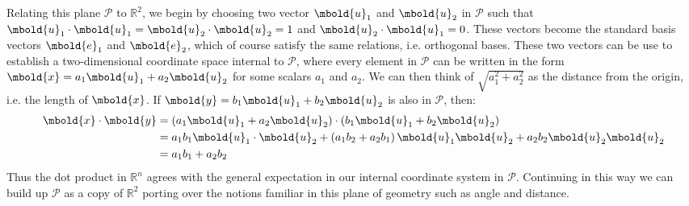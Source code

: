\documentclass[12pt letter]{report}
\begin{document}
Relating this plane $ \mathcal{P}$ to $\mathbb{R}^2$, we begin by choosing two vector $\mbold{u}_1$ and $\mbold{u}_2$ in $ \mathcal{P}$ such that $\mbold{u}_1 \cdot \mbold{u}_1 = \mbold{u}_2 \cdot \mbold{u}_2 = 1$ and $\mbold{u}_2 \cdot \mbold{u}_1 = 0$. These vectors become the standard basis vectors $\mbold{e}_1$ and $\mbold{e}_2$, which of course satisfy the same relations, i.e. orthogonal bases. These two vectors can be use to establish a two-dimensional coordinate space internal to $ \mathcal{P}$, where every element in $\mathcal{P}$ can be written in the form $\mbold{x} = a_1\mbold{u}_1 + a_2\mbold{u}_2$ for some scalars $a_1$ and $a_2$. We can then think of $\sqrt{a_1^2 + a_2^2} $ as the distance from the origin, i.e. the length of $\mbold{x}$. If $\mbold{y} = b_1 \mbold{u}_1 + b_2 \mbold{u}_2$ is also in $\mathcal{P}$, then:
\begin{align*}
  \mbold{x} \cdot \mbold{y} & = \left( a_1\mbold{u}_1 + a_2\mbold{u}_2 \right) \cdot \left( b_1\mbold{u}_1 + b_2\mbold{u}_2 \right)                            \\
                            & = a_1b_1 \mbold{u}_1 \cdot \mbold{u}_2 + \left( a_1b_2 + a_2b_1 \right) \mbold{u}_1 \mbold{u}_2 + a_2b_2 \mbold{u}_2 \mbold{u}_2 \\
                            & = a_1b_1 + a_2b_2                                                                                                                \\
\end{align*}
Thus the dot product in $\mathbb{R}^{n}$ agrees with the general expectation in our internal coordinate system in $\mathcal{P}$. Continuing in this way we can build up $\mathcal{P}$ as a copy of $\mathbb{R}^2$ porting over the notions familiar in this plane of geometry such as angle and distance.



\end{document}

